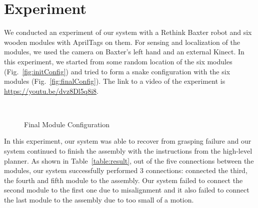 \section{Experiment}

We conducted an experiment of our system with a Rethink Baxter robot and six wooden modules with AprilTags on them. For sensing and localization of the modules, we used the camera on Baxter's left hand and an external Kinect. In this experiment, we started from some random location of the six modules (Fig.~\ref{fig:initConfig}) and tried to form a snake configuration with the six modules (Fig.~\ref{fig:finalConfig}).
The link to a video of the experiment is \url{https://youtu.be/dvz8Dl5q8i8}. 

\begin{figure}[ht!]%
\centering
{}
\quad
{}\\
\caption{Final Module Configuration}
\end{figure}

In this experiment, our system was able to recover from grasping failure and our system continued to finish the assembly with the instructions from the high-level planner. As shown in Table~\ref{table:result}, out of the five connections between the modules, our system successfully performed 3 connections: connected the third, the fourth and fifth module to the assembly. Our system failed to connect the second module to the first one due to misalignment and it also failed to connect the last module to the assembly due to too small of a motion. 


